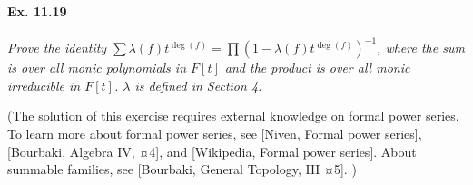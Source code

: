 \documentclass[11pt,a4paper]{article}
\begin{document}
\paragraph{Ex. 11.19}{\it Prove the identity $\sum \lambda(f) t^{\deg(f)} = \prod (1 - \lambda(f) t^{\deg(f)})^{-1}$, where the sum is over all monic polynomials in $F[t]$ and the product is over all monic irreducible in $F[t]$. $\lambda$ is defined in Section 4.
}

\bigskip

(The solution of this exercise requires external knowledge on formal power series. To learn more about formal power series, see [Niven, Formal power series],  [Bourbaki, Algebra IV, ¤4], and [Wikipedia, Formal power series]. About summable families, see [Bourbaki, General Topology, III ¤5]. )

\bigskip
\end{document}
